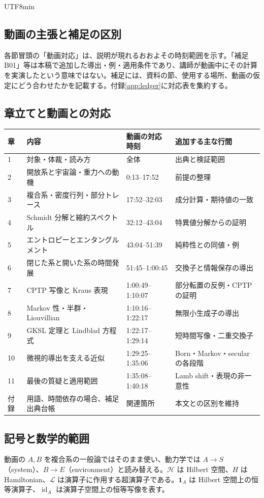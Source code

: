 \documentclass[11pt,a4paper]{article}
\numberwithin{equation}{section}
\newcommand{\id}{\operatorname{id}}
\newcommand{\I}{\mathbf{1}}
\begin{document}
\begin{CJK*}{UTF8}{min}
\subsection{動画の主張と補足の区別}
各節冒頭の「動画対応」は、説明が現れるおおよその時刻範囲を示す。\textcolor{BrickRed}{「補足 B01」等}は本稿で追加した導出・例・適用条件であり、講師が動画中にその計算を実演したという意味ではない。補足には、資料の節、使用する場所、動画の仮定にどう合わせたかを記載する。付録\ref{app:ledger}に対応表を集約する。

\subsection{章立てと動画との対応}
\begin{longtable}{p{}p{}p{}p{}}
\toprule
章 & 内容 & 動画の対応時刻 & 追加する主な行間\\\midrule\endhead
1 & 対象・体裁・読み方 & 全体 & 出典と検証範囲\\
2 & 開放系と宇宙論・重力への動機 & 0:13--17:52 & 前提の整理\\
3 & 複合系・密度行列・部分トレース & 17:52--32:03 & 成分計算・期待値の一致\\
4 & Schmidt 分解と縮約スペクトル & 32:12--43:04 & 特異値分解からの証明\\
5 & エントロピーとエンタングルメント & 43:04--51:39 & 純粋性との同値・例\\
6 & 閉じた系と開いた系の時間発展 & 51:45--1:00:45 & 交換子と情報保存の導出\\
7 & CPTP 写像と Kraus 表現 & 1:00:49--1:10:07 & 部分転置の反例・CPTP の証明\\
8 & Markov 性・半群・Liouvillian & 1:10:16--1:22:17 & 無限小生成子の導出\\
9 & GKSL 定理と Lindblad 方程式 & 1:22:17--1:29:14 & 短時間写像・二重交換子\\
10 & 微視的導出を支える近似 & 1:29:25--1:35:06 & Born・Markov・secular の各段階\\
11 & 最後の質疑と適用範囲 & 1:35:08--1:40:18 & Lamb shift・表現の非一意性\\
付録 & 用語、時間依存の場合、補足出典台帳 & 関連箇所 & 本文との区別を維持\\\bottomrule
\end{longtable}

\subsection{記号と数学的範囲}
動画の $A,B$ を複合系の一般論ではそのまま使い、動力学では $A\to S$（system）、$B\to E$（environment）と読み替える。$\mathcal H$ は Hilbert 空間、$H$ は Hamiltonian、$\mathcal L$ は演算子に作用する超演算子である。$\I_A$ は Hilbert 空間上の恒等演算子、$\id_A$ は演算子空間上の恒等写像を表す。


\end{CJK*}
\end{document}
